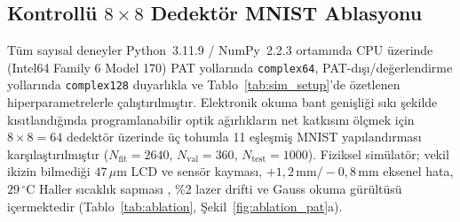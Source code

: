 \documentclass[journal]{IEEEtran}
\begin{document}
\subsection{Kontroll\"u $8\times 8$ Dedekt\"or MNIST Ablasyonu}
T\"um say\i{}sal deneyler Python~3.11.9 / NumPy~2.2.3 ortam\i{}nda CPU \"uzerinde (Intel64 Family 6 Model 170) PAT yollar\i{}nda \texttt{complex64}, PAT-d\i{}\c{s}\i{}/de\u{g}erlendirme yollar\i{}nda \texttt{complex128} duyarl\i{}kla ve Tablo~\ref{tab:sim_setup}'de \"ozetlenen hiperparametrelerle \c{c}al\i{}\c{s}t\i{}r\i{}lm\i{}\c{s}t\i{}r. Elektronik okuma bant geni\c{s}li\u{g}i s\i{}k\i{} \c{s}ekilde k\i{}s\i{}tland\i{}\u{g}\i{}nda programlanabilir optik a\u{g}\i{}rl\i{}klar\i{}n net katk\i{}s\i{}n\i{} \"ol\c{c}mek i\c{c}in $8\times 8 = 64$ dedekt\"or \"uzerinde \"u\c{c} tohumla 11 e\c{s}le\c{s}mi\c{s} MNIST \cite{lecun1998mnist} yap\i{}land\i{}rmas\i{} kar\c{s}\i{}la\c{s}t\i{}r\i{}lm\i{}\c{s}t\i{}r ($N_{\mathrm{fit}}=2640$, $N_{\mathrm{val}}=360$, $N_{\mathrm{test}}=1000$). Fiziksel sim\"ulat\"or; vekil ikizin bilmedi\u{g}i $47\,\mu\text{m}$ LCD ve sens\"or kaymas\i{}, $+1{,}2\,\text{mm}/-0{,}8\,\text{mm}$ eksenel hata, $29\,^\circ\text{C}$ Haller s\i{}cakl\i{}k sapmas\i{} \cite{haller1975thermodynamic,li2005lc}, \%2 lazer drifti ve Gauss okuma g\"ur\"ult\"us\"u i\c{c}ermektedir (Tablo~\ref{tab:ablation}, \c{S}ekil~\ref{fig:ablation_pat}a).
\end{document}
